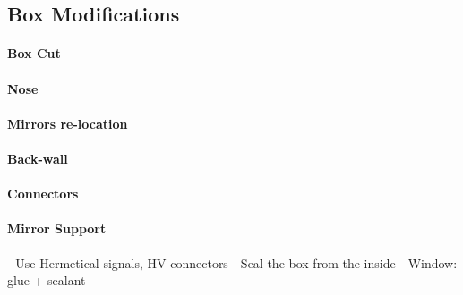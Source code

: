 \subsection{Box Modifications}





\paragraph{Box Cut}
\paragraph{Nose}
\paragraph{Mirrors re-location}
\paragraph{Back-wall}
\paragraph{Connectors}
\paragraph{Mirror Support}



- Use Hermetical signals, HV connectors
- Seal the box from the inside
- Window: glue + sealant

